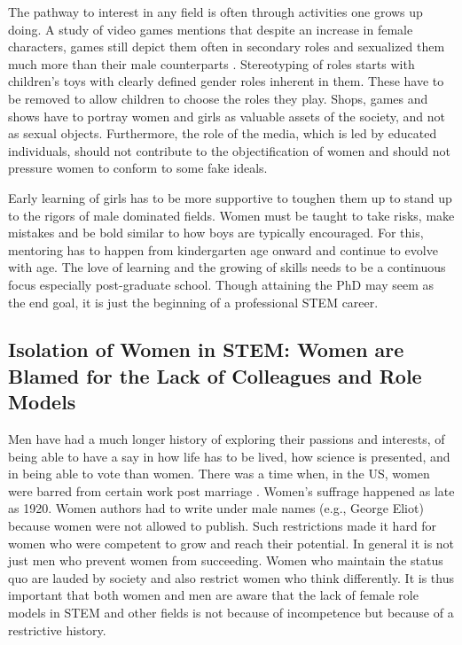 \documentclass[utf8]{frontiersSCNS} %
\begin{document}
The pathway to interest in any field is often through activities one grows up doing. A study of video games mentions that despite an increase in female characters, games still depict them often in secondary roles and sexualized them much more than their male counterparts \citep{lynch2016sexy}. Stereotyping of roles starts with children’s toys with clearly defined gender roles inherent in them. These have to be removed to allow children to choose the roles they play.  Shops, games and shows have to portray women and girls as valuable assets of the society, and not as sexual objects. Furthermore, the role of the media, which is led by educated individuals, should not contribute to the objectification of women and should not  pressure women to conform to some fake ideals.

Early learning of girls has to be more supportive to toughen them up to stand up to the rigors of male dominated fields.  Women must be taught to take risks, make mistakes and be bold similar to how boys are typically encouraged. For this, mentoring has to happen from kindergarten age onward and continue to evolve with age. The love of learning and the growing of skills needs to be a continuous focus especially post-graduate school. Though attaining the PhD may seem as the end goal, it is just the beginning of a professional STEM career.

\subsection{Isolation of Women in STEM: Women are Blamed for the Lack of Colleagues and Role Models}
\label{Sec3}
Men have had a much longer history of exploring their passions and interests, of being able to have a say in how life has to be lived, how science is presented, and in being able to vote than women. There was a time when, in the US, women were barred from certain work post marriage \citep{rindfuss1996women}. Women’s suffrage happened as late as 1920. Women authors had to write under male names (e.g., George Eliot) because women were not allowed to publish. Such restrictions made it hard for women who were competent to grow and reach their potential. In general it is not just men who prevent women from succeeding. Women who maintain the status quo are lauded by society and also restrict women who think differently. It is thus important that both women and men are aware that the lack of female role models in STEM and other fields is not because of incompetence but because of a restrictive history.
\end{document}
